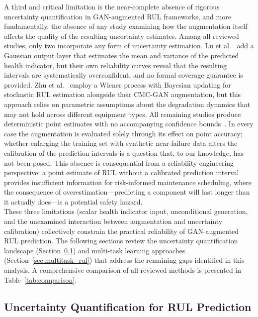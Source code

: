 A third and critical limitation is the near-complete absence of
rigorous uncertainty quantification in GAN-augmented RUL frameworks,
and more fundamentally, the absence of any study examining how the
augmentation itself affects the quality of the resulting uncertainty
estimates. Among all reviewed studies, only two incorporate any form
of uncertainty estimation.
Lu et al.~\cite{lu_joint_2022} add a Gaussian output layer that
estimates the mean and variance of the predicted health indicator,
but their own reliability curves reveal that the resulting intervals
are systematically overconfident, and no formal coverage guarantee is
provided. Zhu et al.~\cite{lubricants13040145} employ a Wiener
process with Bayesian updating for stochastic RUL estimation
alongside their CMC-GAN augmentation, but this approach relies on
parametric assumptions about the degradation dynamics that may not
hold across different equipment types.
All remaining studies produce deterministic point estimates with no
accompanying confidence
bounds~\cite{9486650, vibration7020029, 9300234,
xiong_controlled_2023, behera_generative_2021, cheng_remaining_2023,
wen_gru-ae-wiener_2024}. In every case the augmentation is evaluated
solely through its effect on point accuracy; whether enlarging the
training set with synthetic near-failure data alters the calibration
of the prediction intervals is a question that, to our knowledge, has
not been posed. This absence is consequential from a
reliability engineering perspective: a point estimate of
RUL without a calibrated prediction interval provides insufficient
information for risk-informed maintenance scheduling, where the
consequence of overestimation---predicting a component will last
longer than it actually does---is a potential safety hazard.\\

These three limitations (scalar health indicator input,
unconditional generation, and the unexamined interaction between
augmentation and uncertainty calibration) collectively constrain the
practical reliability of GAN-augmented RUL prediction. The following
sections review the uncertainty quantification landscape
(Section~\ref{sec:uq_rul}) and multi-task learning approaches
(Section~\ref{sec:multitask_rul}) that address the remaining gaps
identified in this analysis. A comprehensive comparison of all
reviewed methods is presented in Table~\ref{tab:comparison}.


\subsection{Uncertainty Quantification for RUL Prediction}
\label{sec:uq_rul}

